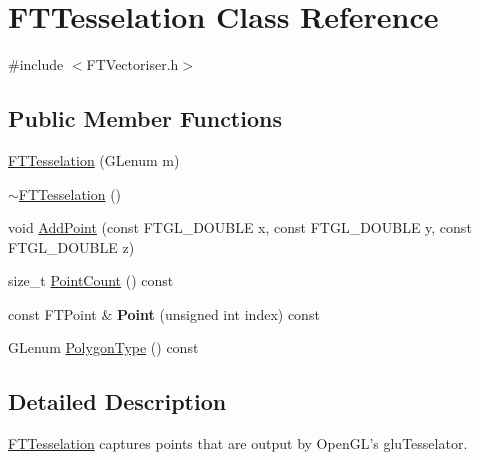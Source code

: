 \hypertarget{class_f_t_tesselation}{\section{F\-T\-Tesselation Class Reference}
\label{class_f_t_tesselation}
}


{\ttfamily \#include $<$F\-T\-Vectoriser.\-h$>$}

\subsection*{Public Member Functions}
\begin{DoxyCompactItemize}
\item 
\hyperlink{class_f_t_tesselation_a8ae81852ffa0dfb1bc65e85dc6d35df2}{F\-T\-Tesselation} (G\-Lenum m)
\item 
\hyperlink{class_f_t_tesselation_a55bd008edbf969720fa3dc083bce1ac0}{$\sim$\-F\-T\-Tesselation} ()
\item 
void \hyperlink{class_f_t_tesselation_a204a9e646cee25f374faad125d71d5e6}{Add\-Point} (const F\-T\-G\-L\-\_\-\-D\-O\-U\-B\-L\-E x, const F\-T\-G\-L\-\_\-\-D\-O\-U\-B\-L\-E y, const F\-T\-G\-L\-\_\-\-D\-O\-U\-B\-L\-E z)
\item 
size\-\_\-t \hyperlink{class_f_t_tesselation_aa3cb26a53c3534576339f946acdc0cc7}{Point\-Count} () const 
\item 
\hypertarget{class_f_t_tesselation_a964ae8f16f216ca545f44a087f31e827}{const F\-T\-Point \& {\bfseries Point} (unsigned int index) const }\label{class_f_t_tesselation_a964ae8f16f216ca545f44a087f31e827}

\item 
G\-Lenum \hyperlink{class_f_t_tesselation_a06c290061a75bad0d38a2d5b2f6b09a1}{Polygon\-Type} () const 
\end{DoxyCompactItemize}


\subsection{Detailed Description}
\hyperlink{class_f_t_tesselation}{F\-T\-Tesselation} captures points that are output by Open\-G\-L's glu\-Tesselator. 

